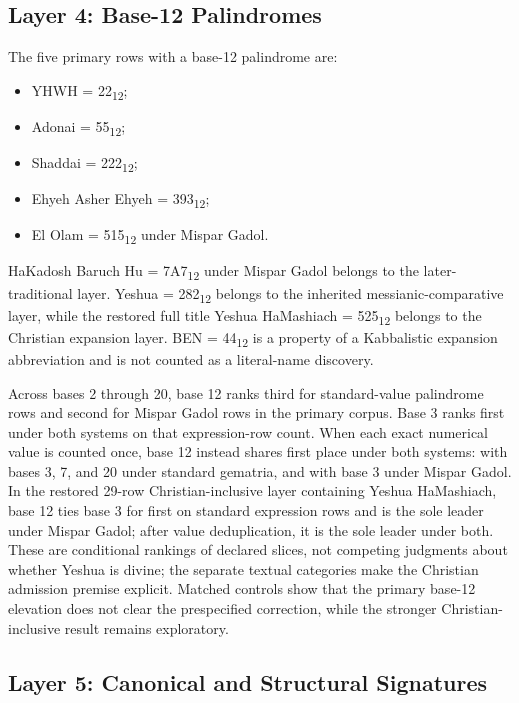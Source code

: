 \subsection{Layer 4: Base-12 Palindromes}

The five primary rows with a base-12 palindrome are:

\begin{itemize}
\item YHWH = 22\textsubscript{12};
\item Adonai = 55\textsubscript{12};
\item Shaddai = 222\textsubscript{12};
\item Ehyeh Asher Ehyeh = 393\textsubscript{12};
\item El Olam = 515\textsubscript{12} under Mispar Gadol.
\end{itemize}

HaKadosh Baruch Hu = 7A7\textsubscript{12} under Mispar Gadol belongs to the later-traditional layer. Yeshua = 282\textsubscript{12} belongs to the inherited messianic-comparative layer, while the restored full title Yeshua HaMashiach = 525\textsubscript{12} belongs to the Christian expansion layer. BEN = 44\textsubscript{12} is a property of a Kabbalistic expansion abbreviation and is not counted as a literal-name discovery.

Across bases 2 through 20, base 12 ranks third for standard-value palindrome rows and second for Mispar Gadol rows in the primary corpus. Base 3 ranks first under both systems on that expression-row count. When each exact numerical value is counted once, base 12 instead shares first place under both systems: with bases 3, 7, and 20 under standard gematria, and with base 3 under Mispar Gadol. In the restored 29-row Christian-inclusive layer containing Yeshua HaMashiach, base 12 ties base 3 for first on standard expression rows and is the sole leader under Mispar Gadol; after value deduplication, it is the sole leader under both. These are conditional rankings of declared slices, not competing judgments about whether Yeshua is divine; the separate textual categories make the Christian admission premise explicit. Matched controls show that the primary base-12 elevation does not clear the prespecified correction, while the stronger Christian-inclusive result remains exploratory.

\subsection{Layer 5: Canonical and Structural Signatures}

